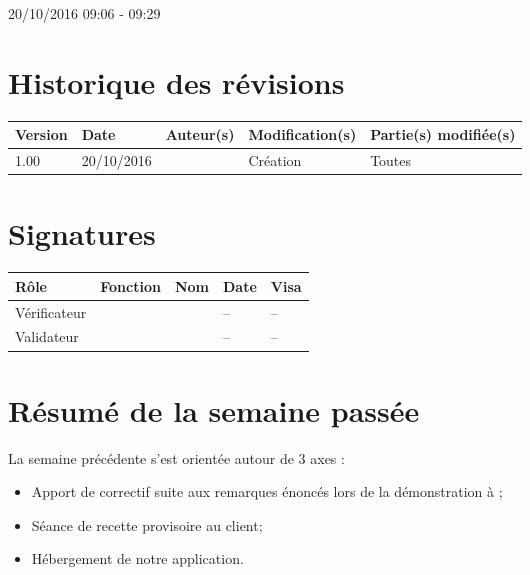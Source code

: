 \documentclass [a4paper] {article}
\begin{document}
20/10/2016			 				%
\hfill   
\hfill 	 09:06 - 09:29				%


\section*{Historique des révisions}
\begin{center}
			\begin{tabular}{| p{2.5cm} | p{3cm} | p{3cm} | p{3cm} | p{3.5cm} |}
				\hline
				\rowcolor{Gray}
				Version & Date & Auteur(s) & Modification(s) & Partie(s) modifiée(s)		 \\
				\hline
				1.00 & 20/10/2016 & \Kafui & Création & Toutes \\
				\hline			
			\end{tabular}
		\end{center}

\section*{Signatures}

		\begin{center}
			\begin{tabular}{| p{2.5cm} | p{4cm} | p{3cm} | p{3cm} | p{2.5cm} |}
				\hline
				\rowcolor{Gray}
				Rôle & Fonction & Nom & Date & Visa		 \\
				\hline
				Vérificateur & \RGC & \Melissa & -- & -- \\[30pt]
				\hline
				Validateur & \CP & \Pierre &  -- & -- \\[30pt]	
				\hline
			\end{tabular}
		\end{center}

\section{Résumé de la semaine passée}
La semaine précédente s'est orientée autour de 3 axes :  
\begin{itemize}
	\item Apport de correctif suite aux remarques énoncés lors de la démonstration à 		\nomTuteurPedago;
	\item Séance de recette provisoire au client;
	\item Hébergement de notre application.
\end{itemize} 
\end{document}
